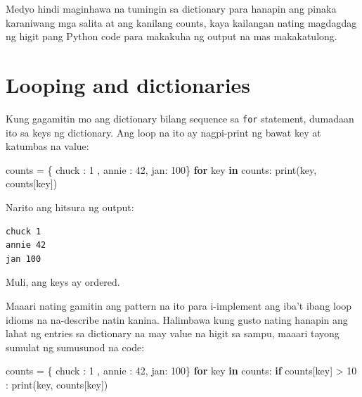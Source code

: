 \documentclass[10pt,]{book}
\newenvironment{Shaded}{}{}
\newcommand{\BuiltInTok}[1]{\textcolor[rgb]{0.00,0.50,0.00}{#1}}
\newcommand{\ControlFlowTok}[1]{\textcolor[rgb]{0.00,0.44,0.13}{\textbf{#1}}}
\newcommand{\DecValTok}[1]{\textcolor[rgb]{0.25,0.63,0.44}{#1}}
\newcommand{\KeywordTok}[1]{\textcolor[rgb]{0.00,0.44,0.13}{\textbf{#1}}}
\newcommand{\NormalTok}[1]{#1}
\newcommand{\OperatorTok}[1]{\textcolor[rgb]{0.40,0.40,0.40}{#1}}
\newcommand{\StringTok}[1]{\textcolor[rgb]{0.25,0.44,0.63}{#1}}
\begin{document}
Medyo hindi maginhawa na tumingin sa dictionary para hanapin ang pinaka
karaniwang mga salita at ang kanilang counts, kaya kailangan nating
magdagdag ng higit pang Python code para makakuha ng output na mas
makakatulong.

\section{Looping and dictionaries}\label{looping-and-dictionaries}

 

Kung gagamitin mo ang dictionary bilang sequence sa \texttt{for}
statement, dumadaan ito sa keys ng dictionary. Ang loop na ito ay
nagpi-print ng bawat key at katumbas na value:

\begin{Shaded}
\begin{Highlighting}[]
\NormalTok{counts }\OperatorTok{=}\NormalTok{ \{ }\StringTok{\textquotesingle{}chuck\textquotesingle{}}\NormalTok{ : }\DecValTok{1}\NormalTok{ , }\StringTok{\textquotesingle{}annie\textquotesingle{}}\NormalTok{ : }\DecValTok{42}\NormalTok{, }\StringTok{\textquotesingle{}jan\textquotesingle{}}\NormalTok{: }\DecValTok{100}\NormalTok{\}}
\ControlFlowTok{for}\NormalTok{ key }\KeywordTok{in}\NormalTok{ counts:}
    \BuiltInTok{print}\NormalTok{(key, counts[key])}
\end{Highlighting}
\end{Shaded}

Narito ang hitsura ng output:

{\small
\begin{verbatim}
chuck 1
annie 42
jan 100
\end{verbatim}
}

Muli, ang keys ay ordered.


Maaari nating gamitin ang pattern na ito para i-implement ang iba't
ibang loop idioms na na-describe natin kanina. Halimbawa kung gusto
nating hanapin ang lahat ng entries sa dictionary na may value na higit
sa sampu, maaari tayong sumulat ng sumusunod na code:

\begin{Shaded}
\begin{Highlighting}[]
\NormalTok{counts }\OperatorTok{=}\NormalTok{ \{ }\StringTok{\textquotesingle{}chuck\textquotesingle{}}\NormalTok{ : }\DecValTok{1}\NormalTok{ , }\StringTok{\textquotesingle{}annie\textquotesingle{}}\NormalTok{ : }\DecValTok{42}\NormalTok{, }\StringTok{\textquotesingle{}jan\textquotesingle{}}\NormalTok{: }\DecValTok{100}\NormalTok{\}}
\ControlFlowTok{for}\NormalTok{ key }\KeywordTok{in}\NormalTok{ counts:}
    \ControlFlowTok{if}\NormalTok{ counts[key] }\OperatorTok{\textgreater{}} \DecValTok{10}\NormalTok{ :}
        \BuiltInTok{print}\NormalTok{(key, counts[key])}
\end{Highlighting}
\end{Shaded}
\end{document}

